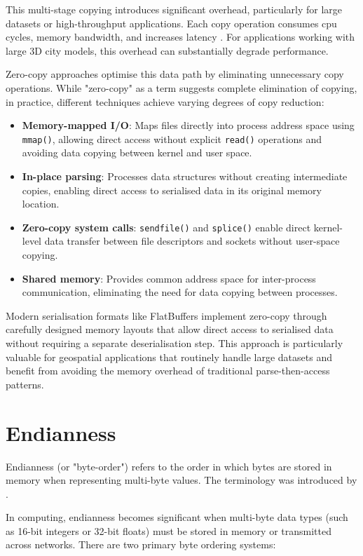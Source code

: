 This multi-stage copying introduces significant overhead, particularly for large datasets or high-throughput applications. Each copy operation consumes \ac{cpu} cycles, memory bandwidth, and increases latency \citep{song2012performance}. For applications working with large 3D city models, this overhead can substantially degrade performance.

Zero-copy approaches optimise this data path by eliminating unnecessary copy operations. While "zero-copy" as a term suggests complete elimination of copying, in practice, different techniques achieve varying degrees of copy reduction:

\begin{itemize}
  \item \textbf{Memory-mapped I/O}: Maps files directly into process address space using \texttt{mmap()}, allowing direct access without explicit \texttt{read()} operations and avoiding data copying between kernel and user space.
  \item \textbf{In-place parsing}: Processes data structures without creating intermediate copies, enabling direct access to serialised data in its original memory location.
  \item \textbf{Zero-copy system calls}: \texttt{sendfile()} and \texttt{splice()} enable direct kernel-level data transfer between file descriptors and sockets without user-space copying.
  \item \textbf{Shared memory}: Provides common address space for inter-process communication, eliminating the need for data copying between processes.
\end{itemize}
Modern serialisation formats like FlatBuffers implement zero-copy through carefully designed memory layouts that allow direct access to serialised data without requiring a separate deserialisation step. This approach is particularly valuable for geospatial applications that routinely handle large datasets and benefit from avoiding the memory overhead of traditional parse-then-access patterns.

\section{Endianness}
\label{tb:endianness}
Endianness (or "byte-order") refers to the order in which bytes are stored in memory when representing multi-byte values. The terminology was introduced by \citet{danny_cohen_1981}.

In computing, endianness becomes significant when multi-byte data types (such as 16-bit integers or 32-bit floats) must be stored in memory or transmitted across networks. There are two primary byte ordering systems:

